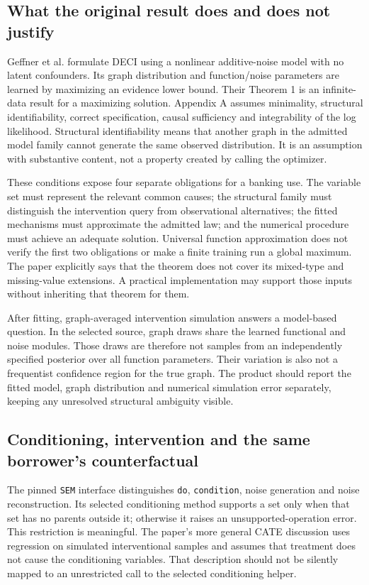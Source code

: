 \subsection{What the original result does and does not justify}

Geffner et al. formulate DECI using a nonlinear additive-noise model with no
latent confounders. Its graph distribution and function/noise parameters are
learned by maximizing an evidence lower bound. Their Theorem 1 is an
infinite-data result for a maximizing solution. Appendix A assumes minimality,
structural identifiability, correct specification, causal sufficiency and
integrability of the log likelihood. Structural identifiability means that
another graph in the admitted model family cannot generate the same observed
distribution. It is an assumption with substantive content, not a property
created by calling the optimizer. \citep{exec14_causica_geffner}

These conditions expose four separate obligations for a banking use. The
variable set must represent the relevant common causes; the structural family
must distinguish the intervention query from observational alternatives;
the fitted mechanisms must approximate the admitted law; and the numerical
procedure must achieve an adequate solution. Universal function approximation
does not verify the first two obligations or make a finite training run a
global maximum. The paper explicitly says that the theorem does not cover
its mixed-type and missing-value extensions. A practical implementation may
support those inputs without inheriting that theorem for them.
\citep{exec14_causica_geffner}

After fitting, graph-averaged intervention simulation answers a model-based
question. In the selected source, graph draws share the learned functional
and noise modules. Those draws are therefore not samples from an independently
specified posterior over all function parameters. Their variation is also
not a frequentist confidence region for the true graph. The product should
report the fitted model, graph distribution and numerical simulation error
separately, keeping any unresolved structural ambiguity visible.
\citep{exec14_causica_primary}

\subsection{Conditioning, intervention and the same borrower's counterfactual}

The pinned \texttt{SEM} interface distinguishes \texttt{do},
\texttt{condition}, noise generation and noise reconstruction. Its selected
conditioning method supports a set only when that set has no parents outside
it; otherwise it raises an unsupported-operation error. This restriction is
meaningful. The paper's more general CATE discussion uses regression on
simulated interventional samples and assumes that treatment does not cause
the conditioning variables. That description should not be silently mapped
to an unrestricted call to the selected conditioning helper.
\citep{exec14_causica_primary,exec14_causica_geffner}

